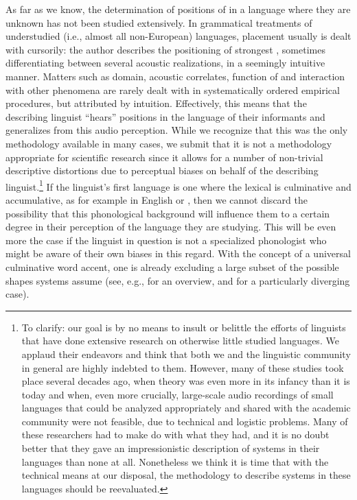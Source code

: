 \documentclass[output=paper]{LSP/langsci}
\begin{document}
As far as we know, the determination of positions of  in a language where they are unknown has not been studied extensively. In grammatical treatments of understudied (i.e., almost all non-European) languages,  placement usually is dealt with cursorily: the author describes the positioning of strong\-est , sometimes differentiating between several acoustic realizations, in a seemingly intuitive manner. Matters such as  domain, acoustic correlates, function of  and interaction with other  phenomena are rarely dealt with in systematically ordered empirical procedures, but attributed by intuition. Effectively, this means that the describing linguist “hears”  positions in the language of their informants and generalizes from this audio perception. While we recognize that this was the only methodology available in many cases, we submit that it is not a methodology appropriate for scientific research since it allows for a number of non-trivial descriptive distortions due to perceptual biases on behalf of the describing linguist.\footnote{To clarify: our goal is by no means to insult or belittle the efforts of linguists that have done extensive research on otherwise little studied languages. We applaud their endeavors and think that both we and the linguistic community in general are highly indebted to them. However, many of these studies took place several decades ago, when  theory was even more in its infancy than it is today and when, even more crucially, large-scale audio recordings of small languages that could be analyzed appropriately and shared with the academic community were not feasible, due to technical and logistic problems. Many of these researchers had to make do with what they had, and it is no doubt better that they gave an impressionistic description of  systems in their languages than none at all. Nonetheless we think it is time that with the technical means at our disposal, the methodology to describe  systems in these languages should be reevaluated.}  If the linguist’s first language is one where the lexical  is culminative and accumulative, as for example in English or , then we cannot discard the possibility that this phonological background will influence them to a certain degree in their perception of the language they are studying. This will be even more the case if the linguist in question is not a specialized phonologist who might be aware of their own biases in this regard. With the concept of a universal culminative word accent, one is already excluding a large subset of the possible shapes  systems assume (see, e.g., \citealt{Hyman2014} for an overview, and \citealt{Kuegler2012} for a particularly diverging case). 
\end{document}

